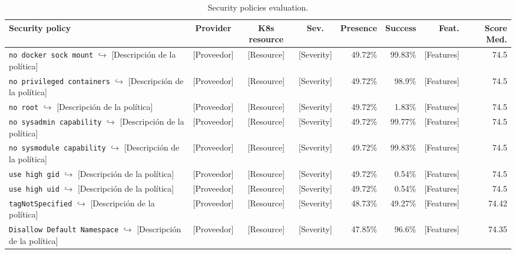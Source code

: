 \begin{table}[ht]
  \caption{Security policies evaluation.}
  \label{tab:Eval}
  \centering
  \scriptsize
  \begin{tabular}{lcccrrrr}
    \toprule
    \textbf{Security policy} & \textbf{Provider} & \textbf{K8s resource} & \textbf{Sev.} & \textbf{Presence} & \textbf{Success} & \textbf{Feat.} & \textbf{Score Med.} \\ \midrule
\makecell[l]{\texttt{no docker sock mount} \\ $\hookrightarrow$ [Descripción de la política]} & [Proveedor] & [Resource] & [Severity] & 49.72\% & 99.83\% & [Features] & 74.5 \\
\makecell[l]{\texttt{no privileged containers} \\ $\hookrightarrow$ [Descripción de la política]} & [Proveedor] & [Resource] & [Severity] & 49.72\% & 98.9\% & [Features] & 74.5 \\
\makecell[l]{\texttt{no root} \\ $\hookrightarrow$ [Descripción de la política]} & [Proveedor] & [Resource] & [Severity] & 49.72\% & 1.83\% & [Features] & 74.5 \\
\makecell[l]{\texttt{no sysadmin capability} \\ $\hookrightarrow$ [Descripción de la política]} & [Proveedor] & [Resource] & [Severity] & 49.72\% & 99.77\% & [Features] & 74.5 \\
\makecell[l]{\texttt{no sysmodule capability} \\ $\hookrightarrow$ [Descripción de la política]} & [Proveedor] & [Resource] & [Severity] & 49.72\% & 99.83\% & [Features] & 74.5 \\
\makecell[l]{\texttt{use high gid} \\ $\hookrightarrow$ [Descripción de la política]} & [Proveedor] & [Resource] & [Severity] & 49.72\% & 0.54\% & [Features] & 74.5 \\
\makecell[l]{\texttt{use high uid} \\ $\hookrightarrow$ [Descripción de la política]} & [Proveedor] & [Resource] & [Severity] & 49.72\% & 0.54\% & [Features] & 74.5 \\
\makecell[l]{\texttt{tagNotSpecified} \\ $\hookrightarrow$ [Descripción de la política]} & [Proveedor] & [Resource] & [Severity] & 48.73\% & 49.27\% & [Features] & 74.42 \\
\makecell[l]{\texttt{Disallow Default Namespace} \\ $\hookrightarrow$ [Descripción de la política]} & [Proveedor] & [Resource] & [Severity] & 47.85\% & 96.6\% & [Features] & 74.35 \\

\end{tabular}
\end{table}
